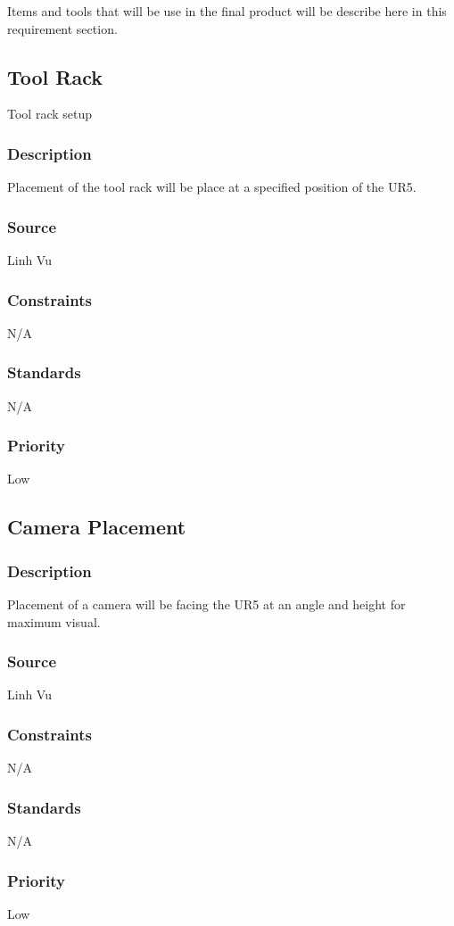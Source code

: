 Items and tools that will be use in the final product will be describe here in this requirement section.

\subsection{Tool Rack}
Tool rack setup
\subsubsection{Description}
Placement of the tool rack will be place at a specified position of the UR5.
\subsubsection{Source}
Linh Vu
\subsubsection{Constraints}
N/A
\subsubsection{Standards}
N/A
\subsubsection{Priority}
Low


\subsection{Camera Placement}
\subsubsection{Description}
Placement of a camera will be facing the UR5 at an angle and height for maximum visual.
\subsubsection{Source}
Linh Vu
\subsubsection{Constraints}
N/A
\subsubsection{Standards}
N/A
\subsubsection{Priority}
Low